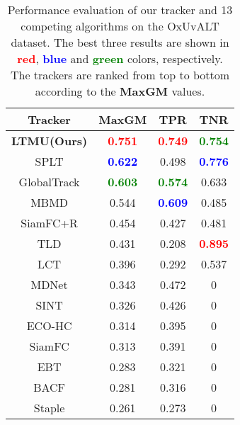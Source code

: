 \documentclass[10pt,twocolumn,letterpaper]{article}
\begin{document}
\vspace{-1mm}
\begin{table}[h]
\caption{Performance evaluation of our tracker and 13 competing algorithms on the OxUvALT dataset.
The best three results are shown in \textcolor{red}{\textbf{red}}, \textcolor{blue}{\textbf{blue}}
and \textcolor{green}{\textbf{green}} colors, respectively. The trackers are ranked from top to bottom
according to the \textbf{MaxGM} values.}
\label{tab:oxuva}
\vspace{-3mm}
\begin{center}
\small
\begin{tabular}{cccc}
\hline
\textbf{Tracker} & \textbf{MaxGM}                        & \textbf{TPR}                          & \textbf{TNR} \\
\hline
\textbf{LTMU(Ours)}    &\textcolor{red}{\textbf{0.751}}  &\textcolor{red}{\textbf{0.749}} &\textcolor{green}{\textbf{0.754}} \\
SPLT                &\textcolor{blue}{\textbf{0.622}} &0.498          &\textcolor{blue}{\textbf{0.776}} \\
GlobalTrack    &\textcolor{green}{\textbf{0.603}} &\textcolor{green}{\textbf{0.574}} & 0.633\\
MBMD            &0.544 &\textcolor{blue}{\textbf{0.609}} &0.485 \\
SiamFC+R      & 0.454                                 & 0.427                                 & 0.481                                 \\
TLD                & 0.431                                 & 0.208                                & \textcolor{red}{\textbf{0.895}} \\
LCT                & 0.396                                 & 0.292                                 & 0.537                                 \\
MDNet            & 0.343                                 & 0.472                                & 0                                     \\
SINT               & 0.326                                 & 0.426                                & 0                                     \\
ECO-HC         & 0.314                                 & 0.395                                & 0                                     \\
SiamFC           & 0.313                                 &0.391                                 & 0                                     \\
EBT                & 0.283                                 & 0.321                                 & 0                                     \\
BACF             & 0.281                                 & 0.316                                 & 0                                     \\
Staple             & 0.261                                 & 0.273                                 & 0                                     \\
\hline
\end{tabular}
\end{center}
\vspace{-7mm}
\end{table}
\end{document}
